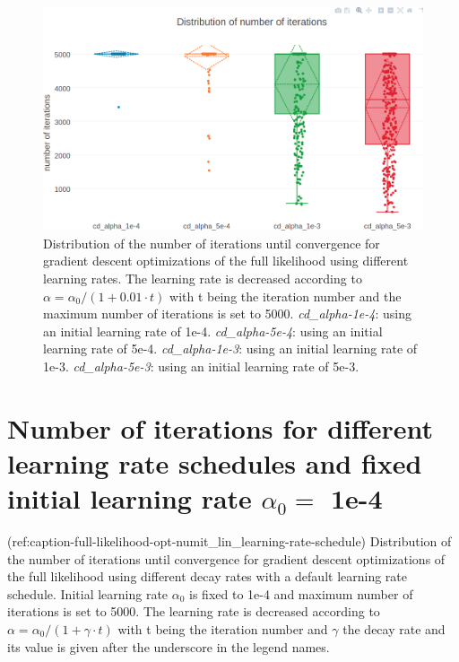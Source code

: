 \documentclass[12pt,a4paper,twoside]{book}
\theoremstyle{definition}
\theoremstyle{definition}
\theoremstyle{remark}
\begin{document}
\begin{figure}

{\centering \includegraphics[width=0.9\linewidth]{img/full_likelihood/appendix/distribution_numiterations_against_lindecay1e-1_different_alphas} 

}

\caption{Distribution of
the number of iterations until convergence for gradient descent
optimizations of the full likelihood using different learning rates. The
learning rate is decreased according to
\(\alpha = \alpha_0 / (1 + 0.01 \cdot t)\) with t being the iteration
number and the maximum number of iterations is set to 5000.
\emph{cd\_alpha-1e-4}: using an initial learning rate of 1e-4.
\emph{cd\_alpha-5e-4}: using an initial learning rate of 5e-4.
\emph{cd\_alpha-1e-3}: using an initial learning rate of 1e-3.
\emph{cd\_alpha-5e-3}: using an initial learning rate of 5e-3.}\label{fig:full-likelihood-opt-different-alphas-numit}
\end{figure}

\section{\texorpdfstring{Number of iterations for different learning
rate schedules and fixed initial learning rate \(\alpha_0 =\)
1e-4}{Number of iterations for different learning rate schedules and fixed initial learning rate \textbackslash{}alpha\_0 = 1e-4}}\label{learning-rate-schedules-distribution-iterations}

(ref:caption-full-likelihood-opt-numit\_lin\_learning-rate-schedule)
Distribution of the number of iterations until convergence for gradient
descent optimizations of the full likelihood using different decay rates
with a default learning rate schedule. Initial learning rate
\(\alpha_0\) is fixed to 1e-4 and maximum number of iterations is set to
5000. The learning rate is decreased according to
\(\alpha = \alpha_0 / (1 + \gamma \cdot t)\) with t being the iteration
number and \(\gamma\) the decay rate and its value is given after the
underscore in the legend names.
\end{document}
